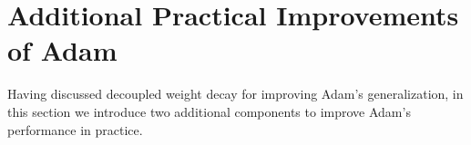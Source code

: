 \documentclass[usenames,dvipsnames]{article} %
\newcommand{\norm}[1]{\left\lVert#1\right\rVert}
\newtheorem{prop}{Proposition}
\newcommand{\note}[1]{
	\noindent~\\
	\vspace{0.25cm}
	\fcolorbox{red}{yellow}{\parbox{0.97\textwidth}{#1\\}}
	\vspace{0.25cm}
}
\newcommand{\vc}[1]{\textit{\textbf{#1}}}
\begin{document}







\section{Additional Practical Improvements of Adam}\label{sec:practical_improvements}
Having discussed decoupled weight decay for improving Adam's generalization, in this section we introduce two additional components to improve Adam's performance in practice.
\end{document}
